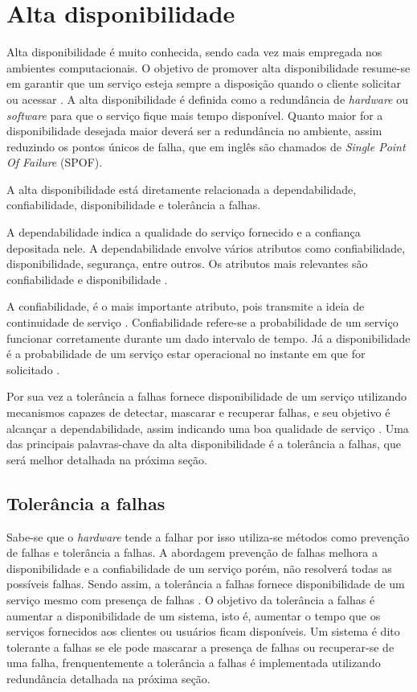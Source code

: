 \chapter{Alta disponibilidade}

Alta disponibilidade é muito conhecida, sendo cada vez mais empregada nos ambientes computacionais. O objetivo de promover alta disponibilidade 
resume-se em garantir que um serviço esteja sempre a disposição quando o cliente solicitar ou acessar \cite{costa2009}.
A alta disponibilidade é definida como a redundância de \textit{hardware} ou \textit{software} para que o serviço fique mais tempo disponível.
Quanto maior for a disponibilidade desejada maior deverá ser a redundância no ambiente, assim reduzindo os pontos únicos de falha,
que em inglês são chamados de \textit{Single Point Of Failure} (SPOF).

A alta disponibilidade está diretamente relacionada a dependabilidade, confiabilidade, disponibilidade e tolerância a falhas. 

A dependabilidade indica a qualidade do serviço fornecido e a confiança depositada nele. A dependabilidade envolve vários
atributos como confiabilidade, disponibilidade, segurança, entre outros. Os atributos mais relevantes são confiabilidade e disponibilidade 
\cite{weber2002}.

A confiabilidade, é o mais importante atributo, pois transmite a ideia de continuidade de serviço \cite{pankaj1994}. Confiabilidade refere-se 
a probabilidade de um serviço funcionar corretamente durante um dado intervalo de tempo. Já a disponibilidade é a probabilidade de um 
serviço estar operacional no instante em que for solicitado \cite{costa2009}.

Por sua vez a tolerância a falhas fornece disponibilidade de um serviço utilizando mecanismos capazes de detectar, mascarar e recuperar falhas, 
e seu objetivo é alcançar a dependabilidade, assim indicando uma boa qualidade de serviço \cite{costa2009}.
Uma das principais palavras-chave da alta disponibilidade é a tolerância a falhas, que será melhor detalhada na próxima seção.

\section{Tolerância a falhas}

Sabe-se que o \textit{hardware} tende a falhar por isso utiliza-se métodos como prevenção de falhas e tolerância a falhas.
A abordagem prevenção de falhas melhora a disponibilidade e a confiabilidade de um serviço porém, não resolverá todas as possíveis falhas.
Sendo assim, a tolerância a falhas fornece disponibilidade de um serviço mesmo com presença de falhas \cite{pankaj1994}.
O objetivo da tolerância a falhas é aumentar a disponibilidade de um sistema, isto é, aumentar o tempo que os serviços fornecidos aos 
clientes ou usuários ficam disponíveis. Um sistema é dito tolerante a falhas se ele pode mascarar a presença de falhas 
ou recuperar-se de uma falha, frenquentemente a tolerância a falhas é implementada utilizando redundância detalhada na próxima seção.


